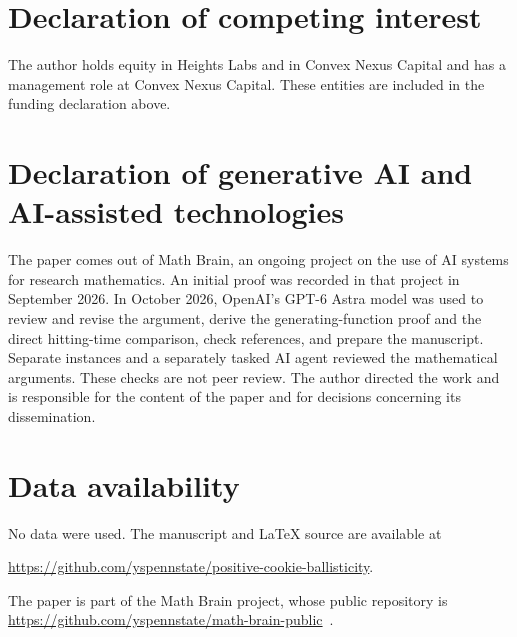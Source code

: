 \documentclass[11pt]{amsart}
\numberwithin{equation}{section}
\theoremstyle{remark}
\begin{document}
\section*{Declaration of competing interest}
The author holds equity in Heights Labs and in Convex Nexus Capital and has a management role at Convex Nexus Capital. These entities are included in the funding declaration above.

\section*{Declaration of generative AI and AI-assisted technologies}
The paper comes out of Math Brain, an ongoing project on the use of AI systems for research mathematics. An initial proof was recorded in that project in September 2026. In October 2026, OpenAI's GPT-6 Astra model was used to review and revise the argument, derive the generating-function proof and the direct hitting-time comparison, check references, and prepare the manuscript. Separate instances and a separately tasked AI agent reviewed the mathematical arguments. These checks are not peer review. The author directed the work and is responsible for the content of the paper and for decisions concerning its dissemination.

\section*{Data availability}
No data were used. The manuscript and LaTeX source are available at\par
\noindent\url{https://github.com/yspennstate/positive-cookie-ballisticity}.

The paper is part of the Math Brain project, whose public repository is \url{https://github.com/yspennstate/math-brain-public}~\cite{MathBrainRepo}.
\end{document}
